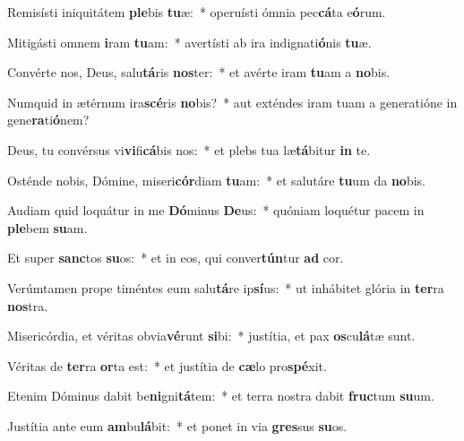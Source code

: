 \item Remisísti iniquitátem \textbf{ple}bis \textbf{tu}æ:~* operuísti ómnia pec\textbf{cá}ta e\textbf{ó}rum.
\item Mitigásti omnem \textbf{i}ram \textbf{tu}am:~* avertísti ab ira indignati\textbf{ó}nis \textbf{tu}æ.
\item Convérte nos, Deus, salu\textbf{tá}ris \textbf{nos}ter:~* et avérte iram \textbf{tu}am a \textbf{no}bis.
\item Numquid in ætérnum ira\textbf{scé}ris \textbf{no}bis?~* aut exténdes iram tuam a generatióne in gene\textbf{ra}ti\textbf{ó}nem?
\item Deus, tu convérsus vi\textbf{vi}fi\textbf{cá}bis nos:~* et plebs tua læ\textbf{tá}bitur \textbf{in} te.
\item Osténde nobis, Dómine, miseri\textbf{cór}diam \textbf{tu}am:~* et salutáre \textbf{tu}um da \textbf{no}bis.
\item Audiam quid loquátur in me \textbf{Dó}minus \textbf{De}us:~* quóniam loquétur pacem in \textbf{ple}bem \textbf{su}am.
\item Et super \textbf{sanc}tos \textbf{su}os:~* et in eos, qui conver\textbf{tún}tur \textbf{ad} cor.
\item Verúmtamen prope timéntes eum salu\textbf{tá}re ip\textbf{sí}us:~* ut inhábitet glória in \textbf{ter}ra \textbf{nos}tra.
\item Misericórdia, et véritas obvia\textbf{vé}runt \textbf{si}bi:~* justítia, et pax \textbf{os}cu\textbf{lá}tæ sunt.
\item Véritas de \textbf{ter}ra \textbf{or}ta est:~* et justítia de \textbf{cæ}lo pro\textbf{spé}xit.
\item Etenim Dóminus dabit be\textbf{ni}gni\textbf{tá}tem:~* et terra nostra dabit \textbf{fruc}tum \textbf{su}um.
\item Justítia ante eum \textbf{am}bu\textbf{lá}bit:~* et ponet in via \textbf{gres}sus \textbf{su}os.
